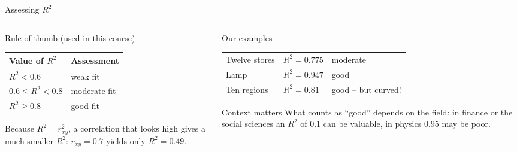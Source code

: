 \documentclass[aspectratio=169,11pt]{beamer}
\begin{document}
\begin{frame}{Assessing $R^{2}$}
  \begin{columns}[T]
    \begin{column}{0.46\textwidth}
      \begin{block}{Rule of thumb (used in this course)}
        \begin{center}
          \renewcommand{\arraystretch}{1.2}
          \begin{tabular}{ll}
            \toprule
            \textbf{Value of $R^{2}$} & \textbf{Assessment} \\
            \midrule
            $R^{2} < 0.6$           & weak fit \\
            $0.6 \le R^{2} < 0.8$   & moderate fit \\
            $R^{2} \ge 0.8$         & good fit \\
            \bottomrule
          \end{tabular}
        \end{center}
      \end{block}
      \small
      Because $R^{2} = r_{xy}^{2}$, a correlation that looks high gives a much
      smaller $R^2$: $r_{xy} = 0.7$ yields only $R^{2} = 0.49$.
    \end{column}
    \begin{column}{0.52\textwidth}
      \small
      \begin{exampleblock}{Our examples}
        \renewcommand{\arraystretch}{1.15}
        \begin{tabular}{@{}lll@{}}
          Twelve stores       & $R^{2} = 0.775$ & moderate \\
          Lamp                & $R^{2} = 0.947$ & good \\
          Ten regions         & $R^{2} = 0.81$  & good -- but curved!
        \end{tabular}
      \end{exampleblock}
      \begin{alertblock}{Context matters}
        What counts as ``good'' depends on the field: in finance or the social
        sciences an $R^2$ of $0.1$ can be valuable, in physics $0.95$ may be
        poor.
      \end{alertblock}
    \end{column}
  \end{columns}
\end{frame}
\end{document}
